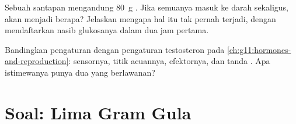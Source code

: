 \begin{exercise}[$\star\star\star$]\label{exo:g12:glucose-and-diabetes:14}
Sebuah santapan mengandung \qty{80}{g} . Jika semuanya masuk
ke darah sekaligus,  akan menjadi berapa? Jelaskan mengapa
hal itu tak pernah terjadi, dengan mendaftarkan nasib glukosanya dalam
dua jam pertama.
\end{exercise}

\begin{exercise}[$\star\star\star$]\label{exo:g12:glucose-and-diabetes:15}
Bandingkan pengaturan  dengan pengaturan testosteron pada
\cref{ch:g11:hormones-and-reproduction}: sensornya, titik acuannya,
efektornya, dan tanda . Apa istimewanya punya dua 
yang berlawanan?
\end{exercise}

\section{Soal: Lima Gram Gula}

